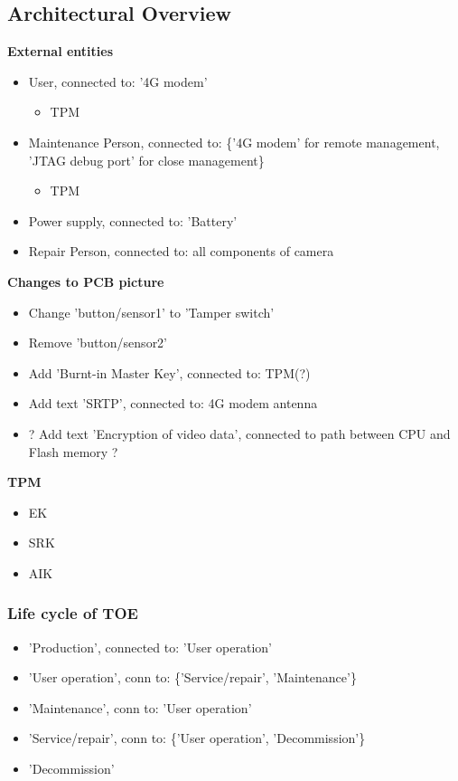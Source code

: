 \documentclass[10pt]{article}
\begin{document}
\subsection{Architectural Overview}
	\textbf{External entities}
	\begin{itemize}
		\item User, connected to: '4G modem'
		\begin{itemize}
			\item TPM
		\end{itemize}
		\item Maintenance Person, connected to: \{'4G modem' for remote management, 'JTAG debug port' for close management\}
		\begin{itemize}
			\item TPM
		\end{itemize}
		\item Power supply, connected to: 'Battery'
		\item Repair Person, connected to: all components of camera %
	\end{itemize}
	\textbf{Changes to PCB picture}
	\begin{itemize}
		\item Change 'button/sensor1' to 'Tamper switch' 
		\item Remove 'button/sensor2'
		\item Add 'Burnt-in Master Key', connected to: TPM(?) %
		\item Add text 'SRTP', connected to: 4G modem antenna
		\item ? Add text 'Encryption of video data', connected to path between CPU and Flash memory ? %
	\end{itemize}
	\textbf{TPM}
	\begin{itemize} %
		\item EK
		\item SRK
		\item AIK
	\end{itemize}

	\subsubsection{Life cycle of TOE}
	\begin{itemize}
		\item 'Production', connected to: 'User operation'
		\item 'User operation', conn to: \{'Service/repair', 'Maintenance'\}
		\item 'Maintenance', conn to: 'User operation'
		\item 'Service/repair', conn to: \{'User operation', 'Decommission'\}
		\item 'Decommission'
	\end{itemize}
\end{document}
